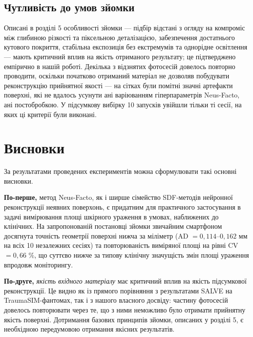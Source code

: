 \documentclass[
  ukrainian,
  10pt,
  a4paper,
  twocolumn]{article}
\begin{document}
\subsection{Чутливість до умов
зйомки}\label{ux447ux443ux442ux43bux438ux432ux456ux441ux442ux44c-ux434ux43e-ux443ux43cux43eux432-ux437ux439ux43eux43cux43aux438}

Описані в розділі 5 особливості зйомки --- підбір відстані з огляду на
компроміс між глибиною різкості та піксельною деталізацією, забезпечення
достатнього кутового покриття, стабільна експозиція без екстремумів та
однорідне освітлення --- мають критичний вплив на якість отриманого
результату; це підтверджено емпірично в нашій роботі. Декілька з
відзнятих фотосесій довелось повторно проводити, оскільки початково
отриманий матеріал не дозволяв побудувати реконструкцію прийнятної
якості --- на сітках були помітні значні артефакти поверхні, які не
вдалось усунути ані варіюванням гіперпараметрів Neus-Facto, ані
постобробкою. У підсумкову вибірку 10 запусків увійшли тільки ті сесії,
на яких ці критерії були виконані.

\onecolumn

\section{Висновки}\label{ux432ux438ux441ux43dux43eux432ux43aux438}

За результатами проведених експериментів можна сформулювати такі основні
висновки.

\textbf{По-перше,} метод Neus-Facto, як і ширше сімейство SDF-методів
нейронної реконструкції неявних поверхонь, є придатним для практичного
застосування в задачі вимірювання площі шкірного ураження в умовах,
наближених до клінічних. На запропонованій постановці зйомки звичайним
смартфоном досягнута точність геометрії поверхні нижча за міліметр (AD
\(= 0,114\)--\(0,162\) мм на всіх 10 незалежних сесіях) та
повторюваність виміряної площі на рівні CV \(= 0,66\) \%, що суттєво
нижче за типову клінічну значущість змін площі ураження впродовж
моніторингу.

\textbf{По-друге,} \emph{якість вхідного матеріалу} має критичний вплив
на якість підсумкової реконструкції. Це видно як із прямого порівняння з
результатами SALVE на TraumaSIM-фантомах, так і з нашого власного
досвіду: частину фотосесій довелось повторювати через те, що з ними
неможливо було отримати прийнятну якість поверхні. Дотримання базових
принципів зйомки, описаних у розділі 5, є необхідною передумовою
отримання якісних результатів.
\end{document}
